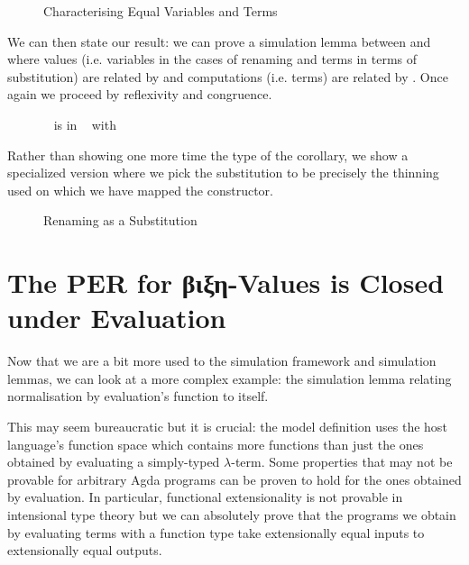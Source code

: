\begin{figure}[h]
\caption{Characterising Equal Variables and Terms\label{fig:vartermR}}
\end{figure}

We can then state our result: we can prove a simulation lemma between 
and  where values (i.e. variables in the cases of renaming and terms
in terms of substitution) are related by  and computations (i.e. terms)
are related by . Once again we proceed by reflexivity and congruence.

\begin{figure}[h]
\caption{~ is in ~ with \label{fig:renissub}}
\end{figure}

Rather than showing one more time the type of the corollary, we show a specialized
version where we pick the substitution to be precisely the thinning used on which we
have mapped the  constructor.

\begin{figure}[h]
\caption{Renaming as a Substitution\label{fig:renassub}}
\end{figure}

\section{The PER for βιξη-Values is Closed under Evaluation}

Now that we are a bit more used to the simulation framework and simulation
lemmas, we can look at a more complex example: the simulation lemma relating
normalisation by evaluation's  function to itself.

This may seem bureaucratic but it is crucial: the model definition uses
the host language's function space which contains more functions than
just the ones obtained by evaluating a simply-typed $λ$-term. Some
properties that may not be provable for arbitrary Agda programs can
be proven to hold for the ones obtained by evaluation. In particular,
functional extensionality is not provable in intensional type theory
but we can absolutely prove that the programs we obtain by evaluating
terms with a function type take extensionally equal inputs to
extensionally equal outputs.


